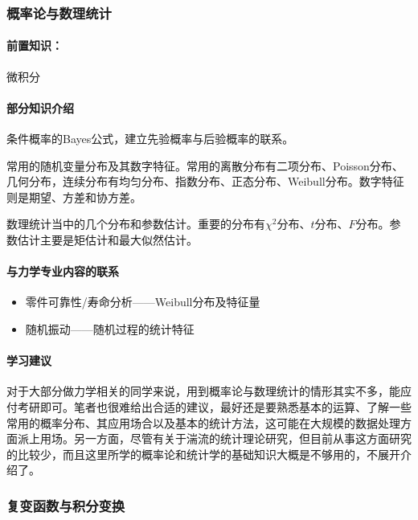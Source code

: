 \subsubsection{概率论与数理统计}

\paragraph{前置知识：}微积分

\paragraph{部分知识介绍}

条件概率的Bayes公式，建立先验概率与后验概率的联系。

常用的随机变量分布及其数字特征。常用的离散分布有二项分布、Poisson分布、几何分布，连续分布有均匀分布、指数分布、正态分布、Weibull分布。数字特征则是期望、方差和协方差。

数理统计当中的几个分布和参数估计。重要的分布有$\chi^2$分布、$t$分布、$F$分布。参数估计主要是矩估计和最大似然估计。

\paragraph{与力学专业内容的联系}

\begin{itemize}
    \item 零件可靠性/寿命分析——Weibull分布及特征量

    \item 随机振动——随机过程的统计特征
\end{itemize}

\paragraph{学习建议}

对于大部分做力学相关的同学来说，用到概率论与数理统计的情形其实不多，能应付考研即可。笔者也很难给出合适的建议，最好还是要熟悉基本的运算、了解一些常用的概率分布、其应用场合以及基本的统计方法，这可能在大规模的数据处理方面派上用场。另一方面，尽管有关于湍流的统计理论研究，但目前从事这方面研究的比较少，而且这里所学的概率论和统计学的基础知识大概是不够用的，不展开介绍了。


\subsubsection{复变函数与积分变换}


